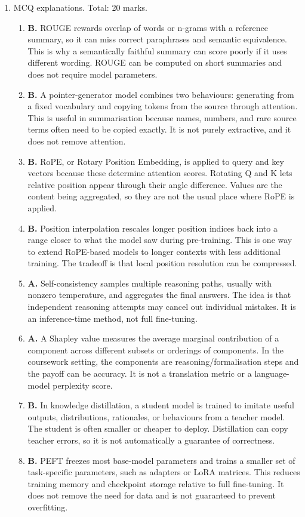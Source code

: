 \documentclass[11pt,a4paper]{article}
\begin{document}
\begin{enumerate}[leftmargin=*]
\item MCQ explanations. Total: 20 marks.
\begin{enumerate}
\item \textbf{B.} ROUGE rewards overlap of words or n-grams with a reference summary, so it can miss correct paraphrases and semantic equivalence. This is why a semantically faithful summary can score poorly if it uses different wording. ROUGE can be computed on short summaries and does not require model parameters.
\item \textbf{B.} A pointer-generator model combines two behaviours: generating from a fixed vocabulary and copying tokens from the source through attention. This is useful in summarisation because names, numbers, and rare source terms often need to be copied exactly. It is not purely extractive, and it does not remove attention.
\item \textbf{B.} RoPE, or Rotary Position Embedding, is applied to query and key vectors because these determine attention scores. Rotating Q and K lets relative position appear through their angle difference. Values are the content being aggregated, so they are not the usual place where RoPE is applied.
\item \textbf{B.} Position interpolation rescales longer position indices back into a range closer to what the model saw during pre-training. This is one way to extend RoPE-based models to longer contexts with less additional training. The tradeoff is that local position resolution can be compressed.
\item \textbf{A.} Self-consistency samples multiple reasoning paths, usually with nonzero temperature, and aggregates the final answers. The idea is that independent reasoning attempts may cancel out individual mistakes. It is an inference-time method, not full fine-tuning.
\item \textbf{A.} A Shapley value measures the average marginal contribution of a component across different subsets or orderings of components. In the coursework setting, the components are reasoning/formalisation steps and the payoff can be accuracy. It is not a translation metric or a language-model perplexity score.
\item \textbf{B.} In knowledge distillation, a student model is trained to imitate useful outputs, distributions, rationales, or behaviours from a teacher model. The student is often smaller or cheaper to deploy. Distillation can copy teacher errors, so it is not automatically a guarantee of correctness.
\item \textbf{B.} PEFT freezes most base-model parameters and trains a smaller set of task-specific parameters, such as adapters or LoRA matrices. This reduces training memory and checkpoint storage relative to full fine-tuning. It does not remove the need for data and is not guaranteed to prevent overfitting.

\end{enumerate}
\end{enumerate}
\end{document}
